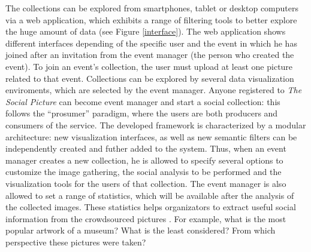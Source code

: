 The collections can be explored from smartphones, tablet or desktop computers via a web application, which exhibits a range of filtering tools to better explore the huge amount of data (see Figure \ref{interface}).
The web application shows different interfaces depending of the specific user and the event in which he has joined after an invitation from the event manager (the person who created the event). To join an event's collection, the user must upload at least one picture related to that event. Collections can be explored by several data visualization enviroments, which are selected by the event manager. Anyone registered to \textit{The Social Picture} can become event manager and start a social collection: this follows the ``prosumer'' paradigm, where the users are both producers and consumers of the service.
The developed framework is characterized by a modular architecture: new visualization interfaces, as well as new semantic filters can be independently created and futher added to the system. 
Thus, when an event manager creates a new collection, he is allowed to specify several options to customize the image gathering, the social analysis to be performed and the visualization tools for the users of that collection.
The event manager is also allowed to set a range of statistics, which will be available after the analysis of the collected images. These statistics helps organizators to extract useful social information from the crowdsourced pictures \cite{Milotta2016n544}. For example, what is the most popular artwork of a museum? What is the least considered? From which perspective these pictures were taken?
